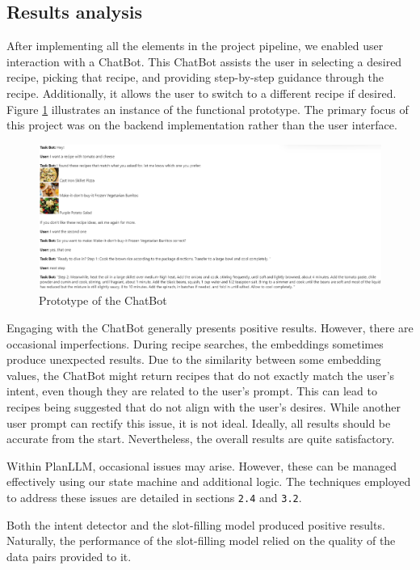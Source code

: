 \documentclass[runningheads]{llncs}
\begin{document}
\subsection{Results analysis}
After implementing all the elements in the project pipeline, we enabled user interaction with a ChatBot. This ChatBot assists the user in selecting a desired recipe, picking that recipe, and providing step-by-step guidance through the recipe. Additionally, it allows the user to switch to a different recipe if desired. Figure \ref{proto} illustrates an instance of the functional prototype. The primary focus of this project was on the backend implementation rather than the user interface.

\begin{figure}[!htbp]
    \center
    \includegraphics[scale=0.3]{images/proto}
    \caption{Prototype of the ChatBot}
    \label{proto}
\end{figure}
Engaging with the ChatBot generally presents positive results. However, there are occasional imperfections. During recipe searches, the embeddings sometimes produce unexpected results. Due to the similarity between some embedding values, the ChatBot might return recipes that do not exactly match the user’s intent, even though they are related to the user’s prompt. This can lead to recipes being suggested that do not align with the user’s desires. While another user prompt can rectify this issue, it is not ideal. Ideally, all results should be accurate from the start. Nevertheless, the overall results are quite satisfactory.

Within PlanLLM, occasional issues may arise. However, these can be managed effectively using our state machine and additional logic. The techniques employed to address these issues are detailed in sections \texttt{2.4} and \texttt{3.2}.

Both the intent detector and the slot-filling model produced positive results. Naturally, the performance of the slot-filling model relied on the quality of the data pairs provided to it.
\end{document}
